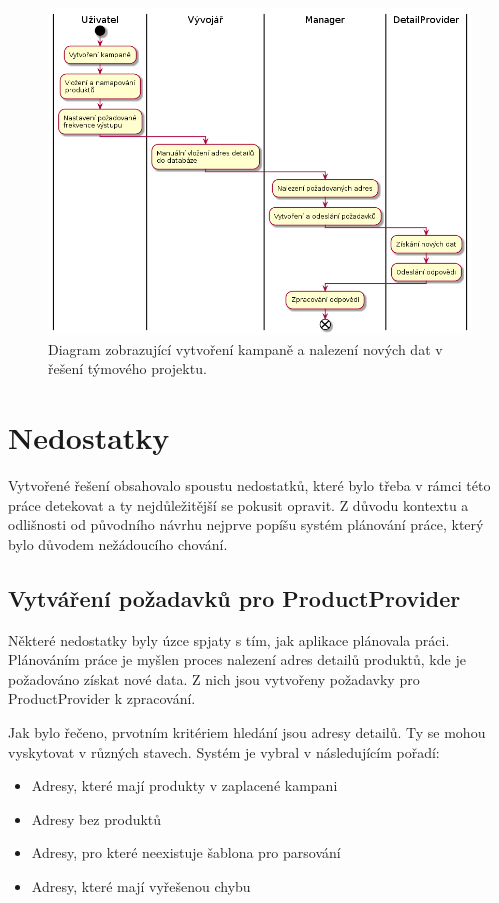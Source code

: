 \documentclass[thesis=B,czech]{FITthesis}[2012/06/26]
\begin{document}
\begin{figure}[h]\centering
 	\includegraphics[width=1.0\textwidth]{resources/legacy-process-activity}
	\caption[Diagram zobrazující vytvoření kampaně a nalezení nových dat v původním řešení týmového projektu]
	{Diagram zobrazující vytvoření kampaně a nalezení nových dat v řešení týmového projektu.}\label{fig:legacyprocess-activity}
\end{figure}

\section{Nedostatky}
Vytvořené řešení obsahovalo spoustu nedostatků, které bylo třeba v rámci této práce detekovat a ty nejdůležitější se pokusit opravit.
Z důvodu kontextu a odlišnosti od původního návrhu nejprve popíšu systém plánování práce, který bylo důvodem nežádoucího chování.

\subsection{Vytváření požadavků pro ProductProvider}
Některé nedostatky byly úzce spjaty s tím, jak aplikace plánovala práci. Plánováním práce je myšlen proces
nalezení adres detailů produktů, kde je požadováno získat nové data. Z nich jsou vytvořeny požadavky pro ProductProvider k zpracování.
\par
Jak bylo řečeno, prvotním kritériem hledání jsou adresy detailů. Ty se mohou vyskytovat v různých stavech. Systém je vybral v 
následujícím pořadí:

\begin{itemize}
\item Adresy, které mají produkty v zaplacené kampani
\item Adresy bez produktů
\item Adresy, pro které neexistuje šablona pro parsování
\item Adresy, které mají vyřešenou chybu
\end{itemize}
\end{document}
